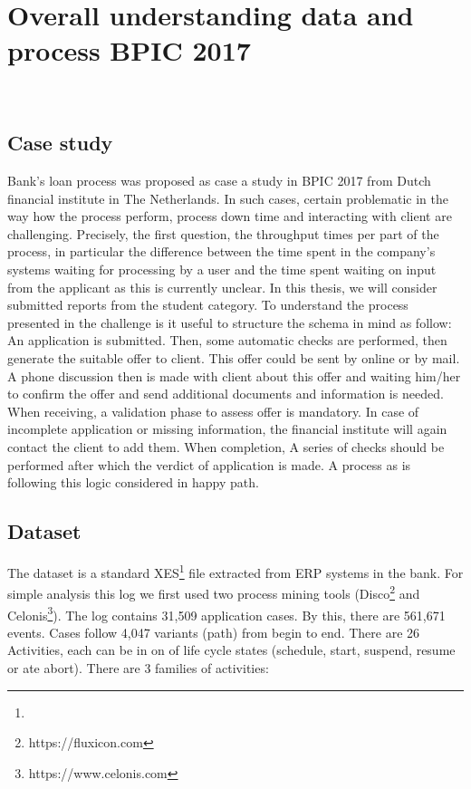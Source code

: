 \chapter{Overall understanding data and process BPIC 2017}
\\

\section{Case study}
Bank's loan process was proposed as case a study in BPIC 2017 from Dutch financial institute in The Netherlands. In such cases, certain problematic in the way how the process perform, process down time and interacting with client are challenging.
Precisely, the first question, the throughput times per part of the process,  in particular the difference between the time spent in the company's systems waiting for processing by a user and the time spent waiting on input from the applicant as this is currently unclear\cite{tue}.
In this thesis, we will consider submitted reports from the student category.
To understand the process presented in the challenge is it useful to structure the schema in mind as follow: An application is submitted. Then, some automatic checks are performed, then generate the suitable offer to client. This offer could be sent by online or by mail. A phone discussion then is made with client about this offer and waiting him/her to confirm the offer and send additional documents and information is needed. When receiving, a validation phase to assess offer is mandatory. In case of incomplete application or missing information, the financial institute will again contact the client to add them. When completion, A series of checks should be performed after which the verdict of application is made. A process as is following this logic considered in happy path.

\section{Dataset}
The dataset is a standard XES\footnote{} file extracted from ERP systems in the bank. For simple analysis this log we first used two process mining tools (Disco\footnote{https://fluxicon.com} and Celonis\footnote{https://www.celonis.com}). The log contains 31,509 application cases. By this, there are 561,671 events. Cases follow 4,047 variants (path) from begin to end.
There are 26 Activities, each can be in on of life cycle states (schedule, start, suspend, resume or ate abort).
There are 3 families of activities: 

